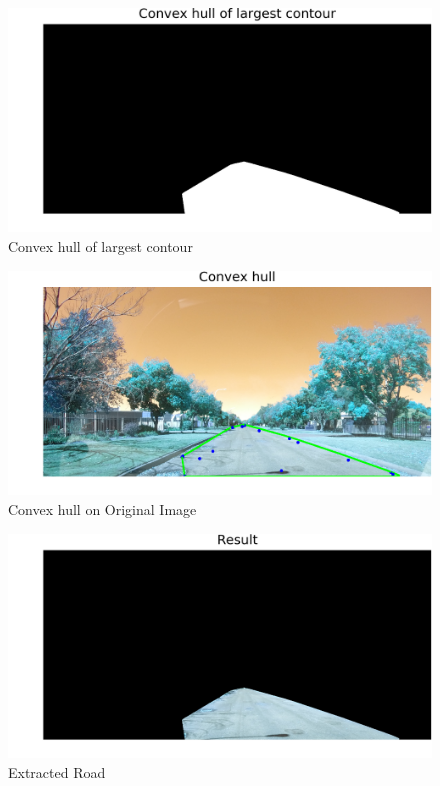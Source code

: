 \documentclass[journal]{IEEEtran}
\begin{document}
\begin{figure}[!htb]
\begin{center}
\includegraphics[scale=0.65]{Images/5_Convex_hull_of_largest_contour.png}
\end{center}
\caption{Convex hull of largest contour}
\end{figure}



\begin{figure}[!htb]
\begin{center}
\includegraphics[scale=1]{Images/6_Convex_hull.png}
\end{center}
\caption{Convex hull on Original Image}
\end{figure}
\newpage

\begin{figure}[!htb]
\begin{center}
\includegraphics[scale=0.65]{Images/7_Result.png}
\end{center}
\caption{Extracted Road}
\end{figure}
\end{document}

